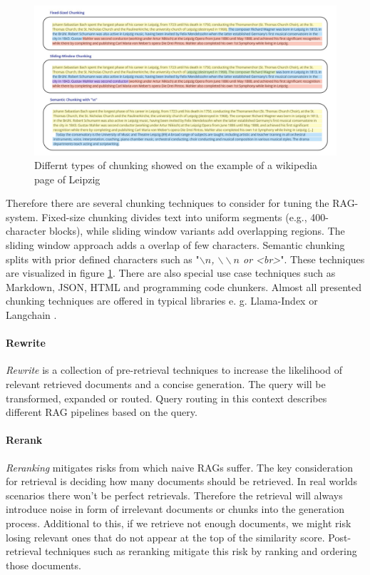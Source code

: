 \begin{figure}
    \centering
    \includegraphics[width=\textwidth]{images/Chunking.pdf}
    \caption{Differnt types of chunking showed on the example of a wikipedia page of Leipzig \cite{LeipzigWikipedia.2025}}
    \label{fig:chunking}
\end{figure}

Therefore there are several chunking techniques to consider for tuning the RAG-system. Fixed-size chunking divides text into uniform segments (e.g., 400-character blocks), while sliding window variants add overlapping regions. The sliding window approach adds a overlap of few characters. Semantic chunking splits with prior defined characters such as "\textit{$\backslash n$, $\backslash\backslash n$ or <br>}". These techniques are visualized in figure \ref{fig:chunking}. There are also special use case techniques such as Markdown, JSON, HTML and programming code chunkers. Almost all presented chunking techniques are offered in typical libraries e. g. Llama-Index \cite{Liu_LlamaIndex_2022} or Langchain \cite{Chase_LangChain_2022}.


\paragraph{Rewrite}
\label{sec:rewrite}
\textit{Rewrite} is a collection of pre-retrieval techniques to increase the likelihood of relevant retrieved documents and a concise generation. The query will be transformed, expanded or routed. Query routing in this context describes different RAG pipelines based on the query.\cite{Gao.18.12.2023}

\paragraph{Rerank}
\label{sec:rerank}
\textit{Reranking} mitigates risks from which naive RAGs suffer. The key consideration for retrieval is deciding how many documents should be retrieved. In real worlds scenarios there won't be perfect retrievals. Therefore the retrieval will always introduce noise in form of irrelevant documents or chunks into the generation process. Additional to this, if we retrieve not enough documents, we might risk losing relevant ones that do not appear at the top of the similarity score. Post-retrieval techniques such as reranking mitigate this risk by ranking and ordering those documents.\cite{Gao.18.12.2023}


